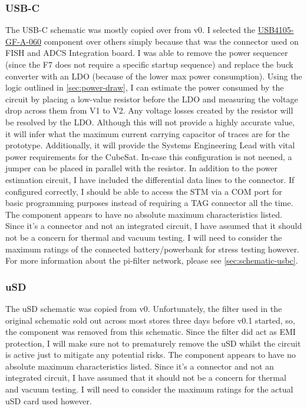\documentclass[10pt]{article}
\newcommand{\nl}{\newline \newline}
\begin{document}
\subsubsection{USB-C}
The USB-C schematic was mostly copied over from v0. I selected the \href{https://au.mouser.com/ProductDetail/GCT/USB4105-GF-A-060?qs=QNEnbhJQKvY2mocwNJzgfA%3D%3D&srsltid=AfmBOort8bam3PRsNUqwercmaRe1QJmm7s2KDVMdeWxPWV6d3H625ZgY}{USB4105-GF-A-060} component over others simply because that was the connector used on FISH and ADCS Integration board.
I was able to remove the power sequencer (since the F7 does not require a specific startup sequence) and replace the buck converter with an LDO (because of the lower max power consumption).
\nl
Using the logic outlined in \autoref{sec:power-draw}, I can estimate the power consumed by the circuit by placing a low-value resistor before the LDO and measuring the voltage drop across them from V1 to V2. Any voltage losses created by the resistor will be resolved by the LDO.
Although this will not provide a highly accurate value, it will infer what the maximum current carrying capacitor of traces are for the prototype. Additionally, it will provide the Systems Engineering Lead with vital power requirements for the CubeSat.
In-case this configuration is not neened, a jumper can be placed in parallel with the resistor.
\nl
In addition to the power estimation circuit, I have included the differential data lines to the connector. If configured correctly, I should be able to access the STM via a COM port for basic programming purposes instead of requiring a TAG connector all the time.
\nl
The component appears to have no absolute maximum characteristics listed. Since it's a connector and not an integrated circuit, I have assumed that it should not be a concern for thermal and vacuum testing. I will need to consider the maximum ratings of the connected battery/powerbank for stress testing however.
\nl
For more information about the pi-filter network, please see \autoref{sec:schematic-usbc}.

\subsubsection{uSD}
The uSD schematic was copied from v0. Unfortunately, the filter used in the original schematic sold out across most stores three days before v0.1 started, so, the component was removed from this schematic.
Since the filter did act as EMI protection, I will make sure not to prematurely remove the uSD whilst the circuit is active just to mitigate any potential risks.
\nl
The component appears to have no absolute maximum characteristics listed. Since it's a connector and not an integrated circuit, I have assumed that it should not be a concern for thermal and vacuum testing. I will need to consider the maximum ratings for the actual uSD card used however.
\end{document}
